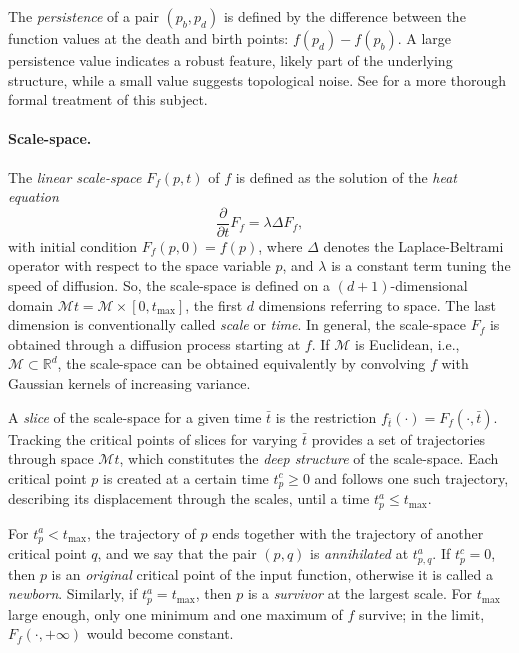 The \emph{persistence} of a pair $(p_b,p_d)$ is defined by the difference between the function values at the death and birth points: $f(p_d)-f(p_b)$.
A large persistence value indicates a robust feature, likely part of the underlying structure, while a small value suggests topological noise.
See \cite{Edelsbrunner:2010} for a more thorough formal treatment of this subject. 

 
\paragraph*{Scale-space.}
The \emph{linear scale-space} $F_f(p,t)$ of $f$ is defined as the solution of the \emph{heat equation} 
\[\frac{\partial}{\partial t} F_f = \lambda \Delta F_f,\]
with initial condition $F_f(p,0)=f(p)$, where $\Delta$ denotes the Laplace-Beltrami operator with respect to the space variable $p$, and $\lambda$ is a constant term tuning the speed of diffusion.
So, the scale-space is defined on a $(d+1)$-dimensional domain ${\mathcal M}t={\mathcal M}\times [0,t_{\max}]$, the first $d$ dimensions referring to space. 
The last dimension is conventionally called \emph{scale} or \emph{time}.
In general, the scale-space $F_f$ is obtained through a diffusion process starting at $f$.
If ${\mathcal M}$ is Euclidean, i.e., ${\mathcal M}\subset\mathbb{R}^d$, the scale-space can be obtained equivalently by convolving $f$ with Gaussian kernels of increasing variance. 

A \emph{slice} of the scale-space for a given time $\bar{t}$ is the restriction $f_{\bar t}(\cdot)=F_f(\cdot,\bar t)$.
Tracking the critical points of slices for varying $\bar t$ provides a set of trajectories through space ${\mathcal M}t$, which constitutes the \emph{deep structure} of the scale-space.
Each critical point $p$ is created at a certain time $t^c_p\geq 0$ and follows one such trajectory, describing its displacement through the scales, until a time $t^a_p\leq t_{\max}$.  

For $t^a_p<t_{\max}$, the trajectory of $p$ ends together with the trajectory of another critical point $q$, and we say that the pair $(p,q)$ is \emph{annihilated} at $t^a_{p,q}$. 
If $t^c_p=0$, then $p$ is an \emph{original} critical point of the input function, otherwise it is called a \emph{newborn}. 
Similarly, if $t^a_p=t_{\max}$, then $p$ is a \emph{survivor} at the largest scale.
For $t_{\max}$ large enough, only one minimum and one maximum of $f$ survive;
in the limit,  $F_f(\cdot,+\infty)$ would become constant. 

